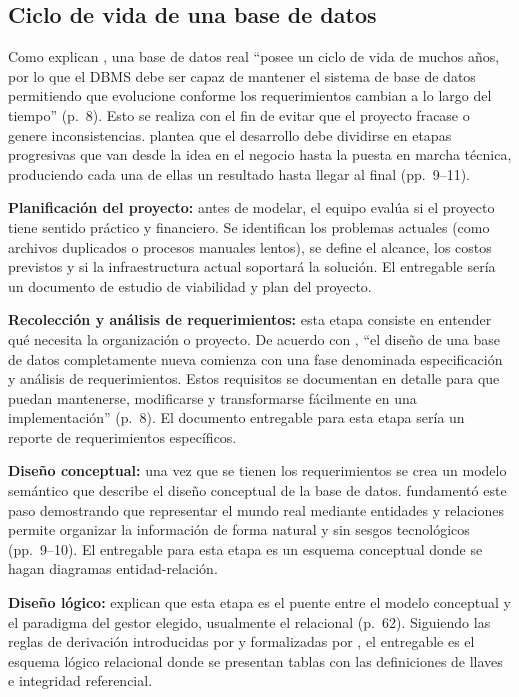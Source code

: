 \subsection{Ciclo de vida de una base de datos}

Como explican \textcite{elmasri_navathe}, una base de datos real \enquote{posee un ciclo de vida de muchos años, por lo que el DBMS debe ser capaz de mantener el sistema de base de datos permitiendo que evolucione conforme los requerimientos cambian a lo largo del tiempo} (p.~8). Esto se realiza con el fin de evitar que el proyecto fracase o genere inconsistencias. \textcite{chen_er_model} plantea que el desarrollo debe dividirse en etapas progresivas que van desde la idea en el negocio hasta la puesta en marcha técnica, produciendo cada una de ellas un resultado hasta llegar al final (pp.~9--11).

\textbf{Planificación del proyecto:} antes de modelar, el equipo evalúa si el proyecto tiene sentido práctico y financiero. Se identifican los problemas actuales (como archivos duplicados o procesos manuales lentos), se define el alcance, los costos previstos y si la infraestructura actual soportará la solución. El entregable sería un documento de estudio de viabilidad y plan del proyecto.

\textbf{Recolección y análisis de requerimientos:} esta etapa consiste en entender qué necesita la organización o proyecto. De acuerdo con \textcite{elmasri_navathe}, \enquote{el diseño de una base de datos completamente nueva comienza con una fase denominada especificación y análisis de requerimientos. Estos requisitos se documentan en detalle para que puedan mantenerse, modificarse y transformarse fácilmente en una implementación} (p.~8). El documento entregable para esta etapa sería un reporte de requerimientos específicos.

\textbf{Diseño conceptual:} una vez que se tienen los requerimientos se crea un modelo semántico que describe el diseño conceptual de la base de datos. \textcite{chen_er_model} fundamentó este paso demostrando que representar el mundo real mediante entidades y relaciones permite organizar la información de forma natural y sin sesgos tecnológicos (pp.~9--10). El entregable para esta etapa es un esquema conceptual donde se hagan diagramas entidad-relación.

\textbf{Diseño lógico:} \textcite{elmasri_navathe} explican que esta etapa es el puente entre el modelo conceptual y el paradigma del gestor elegido, usualmente el relacional (p.~62). Siguiendo las reglas de derivación introducidas por \textcite[p.~28]{chen_er_model} y formalizadas por \textcite[p.~289]{elmasri_navathe}, el entregable es el esquema lógico relacional donde se presentan tablas con las definiciones de llaves e integridad referencial.

